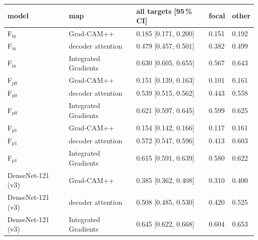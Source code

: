 \begin{tabular}{lllll}
\toprule
model & map & all targets [95\,\% CI] & focal & other \\
\midrule
F$_\mathrm{in}$ & Grad-CAM++ & 0.185 [0.171, 0.200] & 0.151 & 0.192 \\
F$_\mathrm{in}$ & decoder attention & 0.479 [0.457, 0.501] & 0.382 & 0.499 \\
F$_\mathrm{in}$ & Integrated Gradients & 0.630 [0.605, 0.655] & 0.567 & 0.643 \\
F$_\mathrm{p0}$ & Grad-CAM++ & 0.151 [0.139, 0.163] & 0.101 & 0.161 \\
F$_\mathrm{p0}$ & decoder attention & 0.539 [0.515, 0.562] & 0.443 & 0.558 \\
F$_\mathrm{p0}$ & Integrated Gradients & 0.621 [0.597, 0.645] & 0.599 & 0.625 \\
F$_\mathrm{p1}$ & Grad-CAM++ & 0.154 [0.142, 0.166] & 0.117 & 0.161 \\
F$_\mathrm{p1}$ & decoder attention & 0.572 [0.547, 0.596] & 0.413 & 0.603 \\
F$_\mathrm{p1}$ & Integrated Gradients & 0.615 [0.591, 0.639] & 0.580 & 0.622 \\
DenseNet-121 (v3) & Grad-CAM++ & 0.385 [0.362, 0.408] & 0.310 & 0.400 \\
DenseNet-121 (v3) & decoder attention & 0.508 [0.485, 0.530] & 0.420 & 0.525 \\
DenseNet-121 (v3) & Integrated Gradients & 0.645 [0.622, 0.668] & 0.604 & 0.653 \\
\bottomrule
\end{tabular}

